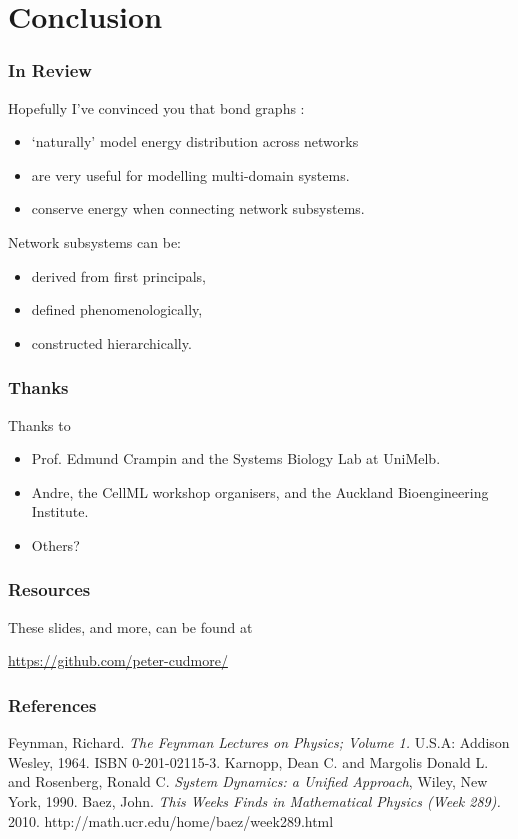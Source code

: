 \documentclass[11pt,reqno]{beamer}
\begin{document}
\section{Conclusion}
\begin{frame}
\frametitle{In Review}
Hopefully I've convinced you that bond graphs :
\begin{itemize}
	\item `naturally' model energy distribution across networks
	\item are very useful for modelling multi-domain systems.
	\item conserve energy when connecting network subsystems.
\end{itemize}
\vspace{22pt}

Network subsystems can be:
\begin{itemize}
	\item derived from first principals,
	\item defined phenomenologically, 
	\item constructed hierarchically.
\end{itemize}
\end{frame}
\begin{frame}
\frametitle{Thanks}
Thanks to
\begin{itemize}
	\item Prof. Edmund Crampin and the Systems Biology Lab at UniMelb.
	\item Andre, the CellML workshop organisers, and the Auckland Bioengineering Institute.
	\item Others?
\end{itemize}
\end{frame}

\begin{frame}
\frametitle{Resources}
\begin{center}
These slides, and more, can be found at

\url{https://github.com/peter-cudmore/}

\end{center}


\end{frame}
\begin{frame}
\frametitle{References}
{\tiny
	\begin{thebibliography}{3}
		 Feynman, Richard. \emph{The Feynman Lectures on Physics; Volume 1.} U.S.A: Addison Wesley, 1964. ISBN 0-201-02115-3.
		 Karnopp, Dean C. and Margolis Donald L. and Rosenberg, Ronald C. \emph{System Dynamics: a Unified Approach}, Wiley, New York, 1990.
		 Baez, John. \emph{This Weeks Finds in Mathematical Physics (Week 289).} 2010.  http://math.ucr.edu/home/baez/week289.html 
\end{thebibliography}}
\end{frame}
\end{document}
